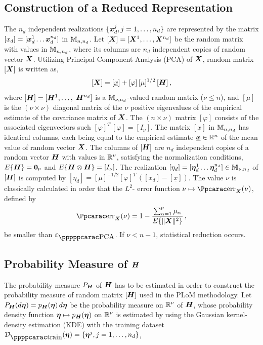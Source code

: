 \subsection{Construction of a Reduced Representation}
\label{sec:PLoM.1}
%
The $n_d$ independent realizations $\{{\boldsymbol{x}}_d^j , j=1,\ldots , n_d\}$ are represented by the matrix $[x_d]= [{\boldsymbol{x}}_d^1 \ldots {\boldsymbol{x}}_d^{n_d}]$ in ${\mathbb{M}}_{n,n_d}$. Let $[{\boldsymbol{X}}]= [{\boldsymbol{X}}^1,\ldots ,{\boldsymbol{X}}^{n_d}]$ be the random matrix with values in ${\mathbb{M}}_{n,n_d}$, where its columns are $n_d$ independent copies of random vector ${\boldsymbol{X}}$. Utilizing Principal Component Analysis (PCA) of ${\boldsymbol{X}}$, random matrix $[{\boldsymbol{X}}]$ is written as,
%
\begin{equation}\label{eqPLoM1}
[{\boldsymbol{X}}] = [\underline x] + [\varphi]\, [\mu]^{1/2}\, [{\boldsymbol{H}}]\, ,
\end{equation}
%
where $[{\boldsymbol{H}}] = [{\boldsymbol{H}}^1,\ldots ,$ ${\boldsymbol{H}}^{n_d}]$ is a ${\mathbb{M}}_{\nu,n_d}$-valued random matrix ($\nu\leq n$), and $[\mu]$ is the $(\nu\times\nu)$ diagonal matrix of the $\nu$ positive eigenvalues of the empirical estimate of the covariance matrix of ${\boldsymbol{X}}$. The $(n\times\nu)$ matrix $[\varphi]$ consists of the associated eigenvectors such $[\varphi]^T\,[\varphi]= [I_{\nu}]$. The matrix $[\underline x]$ in ${\mathbb{M}}_{n,n_d}$ has identical columns, each being equal to the empirical estimate $\underline{{\boldsymbol{x}}}\in{\mathbb{R}}^{n}$ of the mean value of random vector ${\boldsymbol{X}}$. The columns of $[{\boldsymbol{H}}]$ are $n_d$ independent copies of a random vector ${\boldsymbol{H}}$ with values in ${\mathbb{R}}^{\nu}$, satisfying the normalization conditions, $E\{{\boldsymbol{H}}\}={ \hbox{\bf 0} }_\nu$ and $E\{{\boldsymbol{H}}\otimes {\boldsymbol{H}}\}= [I_\nu]$. The realization $[\eta_d] = [{\boldsymbol{\eta}}^{1}_d \ldots {\boldsymbol{\eta}}^{n_d}_d] \in {\mathbb{M}}_{\nu,n_d}$ of $[{\boldsymbol{H}}]$  is computed by $[\eta_d] =  [\mu]^{-1/2} [\varphi]^T\, ([x_d] - [\underline x])$. The value $\nu$ is classically calculated in order that the $L^2$- error function $\nu\mapsto \err_\bfX(\nu)$, defined by
\begin{equation}\label{eqPLoM2}
\err_\bfX(\nu) = 1 - \frac{\sum_{\alpha=1}^\nu \mu_\alpha}{E\{\Vert\bfX\Vert^2\}} \, ,
\end{equation}
%
be smaller than $\varepsilon_\PCA$. If $\nu < n-1$, statistical reduction occurs.

\subsection[Probability Measure of H]{Probability Measure of ${\boldsymbol{H}}$}
\label{sec:PLoM.2}

The probability measure $P_{\boldsymbol{H}}$ of ${\boldsymbol{H}}$ has to be estimated in order to construct the probability measure of random matrix $[{\boldsymbol{H}}]$ used in the PLoM methodology. Let $P_{\boldsymbol{H}}(d{\boldsymbol{\eta}}) = p_{\boldsymbol{H}}({\boldsymbol{\eta}})\, d{\boldsymbol{\eta}}$ be the probability measure on ${\mathbb{R}}^\nu$ of ${\boldsymbol{H}}$, whose probability density function ${\boldsymbol{\eta}}\mapsto p_{\boldsymbol{H}}({\boldsymbol{\eta}})$ on ${\mathbb{R}}^\nu$ is estimated by using the Gaussian kernel-density estimation (KDE) with the training dataset $\curD_\ptraining(\bfeta) = \{\bfeta^j,j=1,\ldots,n_d\}$,

